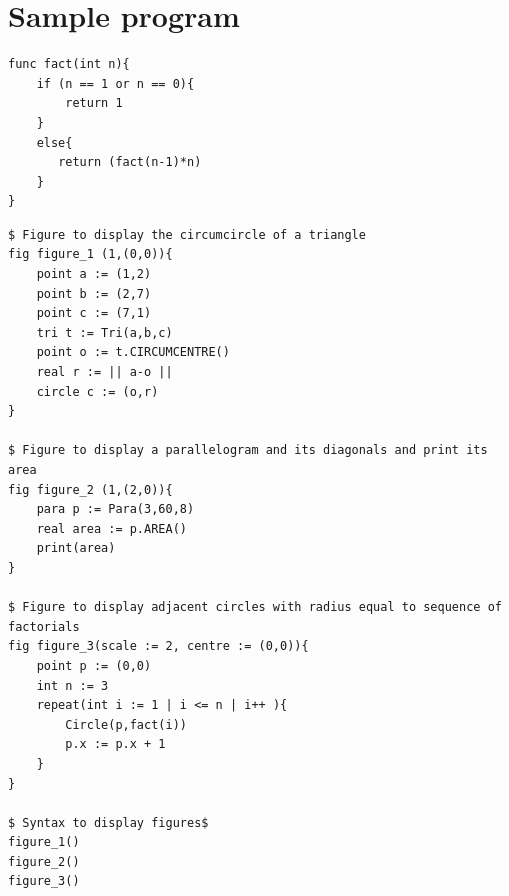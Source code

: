 \documentclass[12pt]{article}
\begin{document}
\section{Sample program}
\begin{verbatim}
func fact(int n){
    if (n == 1 or n == 0){
        return 1
    }
    else{
       return (fact(n-1)*n)
    }
}
\end{verbatim}
\pagebreak
\begin{verbatim}
$ Figure to display the circumcircle of a triangle
fig figure_1 (1,(0,0)){
    point a := (1,2)
    point b := (2,7)
    point c := (7,1)
    tri t := Tri(a,b,c)
    point o := t.CIRCUMCENTRE()
    real r := || a-o ||
    circle c := (o,r)   
}

$ Figure to display a parallelogram and its diagonals and print its area
fig figure_2 (1,(2,0)){
    para p := Para(3,60,8)
    real area := p.AREA()
    print(area)
}

$ Figure to display adjacent circles with radius equal to sequence of factorials
fig figure_3(scale := 2, centre := (0,0)){
    point p := (0,0)
    int n := 3
    repeat(int i := 1 | i <= n | i++ ){
        Circle(p,fact(i))
        p.x := p.x + 1
    }
}

$ Syntax to display figures$
figure_1()
figure_2()
figure_3()
\end{verbatim}
\end{document}
